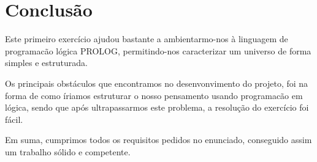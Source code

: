 \documentclass{report}
\begin{document}
\chapter{Conclusão} \label{concl}
 
Este primeiro exercício ajudou bastante a ambientarmo-nos à linguagem de programacão lógica PROLOG, permitindo-nos caracterizar um universo de forma simples e estruturada.\par
Os principais obstáculos que encontramos no desenvonvimento do projeto, foi na forma de como íriamos estruturar o nosso pensamento usando programacão em lógica, sendo que após ultrapassarmos este problema, a resolução do exercício foi fácil.\par
Em suma, cumprimos todos os requisitos pedidos no enunciado, conseguido assim um trabalho sólido e competente.
 


 
 
 
\end{document}
